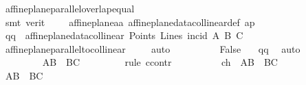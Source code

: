 \begin{isabellebody}
\ affine{\isacharunderscore}{\kern0pt}plane{\isachardot}{\kern0pt}parallel{\isacharunderscore}{\kern0pt}overlap{\isacharunderscore}{\kern0pt}equal\isanewline
\ \ \ \ \ \ \ \ \ \ \isamarkupfalse%
\ {\isacharparenleft}{\kern0pt}smt\ {\isacharparenleft}{\kern0pt}verit{\isacharparenright}{\kern0pt}\ {\isachardoublequoteopen}{}{\isachardoublequoteclose}\ {\isachardoublequoteopen}{}{\isachardoublequoteclose}\ {\isachardoublequoteopen}{}{\isachardoublequoteclose}\ {\isachardoublequoteopen}{}{\isachardoublequoteclose}\ affine{\isacharunderscore}{\kern0pt}plane{\isachardot}{\kern0pt}a{}a\ affine{\isacharunderscore}{\kern0pt}plane{\isacharunderscore}{\kern0pt}data{\isachardot}{\kern0pt}collinear{\isacharunderscore}{\kern0pt}def\ ap{\isacharparenright}{\kern0pt}\isanewline
\ \ \ \ \ \ \ \ \isamarkupfalse%
\ qq{\isacharcolon}{\kern0pt}\ {\isachardoublequoteopen}\ affine{\isacharunderscore}{\kern0pt}plane{\isacharunderscore}{\kern0pt}data{\isachardot}{\kern0pt}collinear\ Points\ Lines\ {\isacharparenleft}{\kern0pt}incid{\isacharparenright}{\kern0pt}\ A\ B\ C{\isachardoublequoteclose}\ \isamarkupfalse%
\ affine{\isacharunderscore}{\kern0pt}plane{\isachardot}{\kern0pt}parallel{\isacharunderscore}{\kern0pt}to{\isacharunderscore}{\kern0pt}collinear\ \isamarkupfalse%
\ {}\ \isamarkupfalse%
\ auto\isanewline
\ \ \ \ \ \ \ \ \isamarkupfalse%
\ {\isachardoublequoteopen}False{\isachardoublequoteclose}\ \isamarkupfalse%
\ {\isachardoublequoteopen}{}{\isachardoublequoteclose}\ qq\ \isamarkupfalse%
\ auto\isanewline
\ \ \ \ \ \ \isamarkupfalse%
\isanewline
\ \ \ \ \ \ \isamarkupfalse%
\ {}{}{\isacharcolon}{\kern0pt}\ {\isachardoublequoteopen}{\isacharquery}{\kern0pt}AB\ {\isasymnoteq}\ {\isacharquery}{\kern0pt}BC{\isachardoublequoteclose}\ \isanewline
\ \ \ \ \ \ \isamarkupfalse%
\ {\isacharparenleft}{\kern0pt}rule\ ccontr{\isacharparenright}{\kern0pt}\isanewline
\ \ \ \ \ \ \ \ \isamarkupfalse%
\ ch{\isacharcolon}{\kern0pt}\ {\isachardoublequoteopen}{\isasymnot}\ {\isacharparenleft}{\kern0pt}{\isacharquery}{\kern0pt}AB\ {\isasymnoteq}\ {\isacharquery}{\kern0pt}BC{\isacharparenright}{\kern0pt}{\isachardoublequoteclose}\isanewline
\ \ \ \ \ \ \ \ \isamarkupfalse%
\ {\isachardoublequoteopen}{\isacharquery}{\kern0pt}AB\ {\isacharequal}{\kern0pt}\ {\isacharquery}{\kern0pt}BC{\isachardoublequoteclose}\ \isamarkupfalse%

\end{isabellebody}
